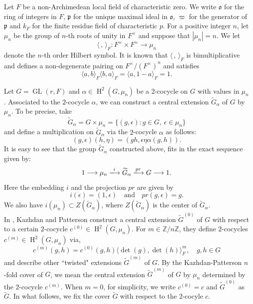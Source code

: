\documentclass[11pt, a4paper, reqno]{amsart}
\theoremstyle{definition}
\theoremstyle{remark}
\theoremstyle{example}
\theoremstyle{note}
\numberwithin{equation}{section}
\DeclareMathOperator{\GL}{GL}
\DeclareMathOperator{\coh}{H}
\begin{document}
Let $F$ be a non-Archimedean local field of characteristic zero. We write $\mathfrak{o}$ for the ring of integers in $F$, $\mathfrak{p}$ for the unique maximal ideal in $\mathfrak{o}$, $\varpi$ for the generator of $\mathfrak{p}$ and $k_{F}$ for the finite residue field of characteristic $p$. For a positive integer $n$, let $\mu_{n}$ be the group of $n$-th roots of unity in $F^{\times}$ and suppose that $|\mu_{n}|=n.$ We let \[\langle \, , \, \rangle_F: F^{\times}\times F^{\times}\rightarrow \mu_{n}\] denote the $n$-th order Hilbert symbol. It %
is known that $\langle \, , \, \rangle_{F}$ is bimultiplicative and defines a non-degenerate pairing on $F^\times/(F^\times)^{n}$ and satisfies
$$\langle a,b\rangle_F \langle b,a\rangle_F= \langle a,1-a\rangle_F=1.$$ 

Let $G=\GL(r,F)$ and $\alpha\in\coh^{2}(G, \mu_{n})$ be a 2-cocycle on $G$ with values in $\mu_{n}$. Associated to the $2$-cocycle $\alpha$,
we can construct a central extension $\widetilde{G}_\alpha$ of $G$ by $\mu_n$. To be precise, take $$\widetilde{G}_\alpha = G \times \mu_n = \{(g, \epsilon): g \in G, ~ \epsilon \in \mu_n\}$$ and define a multiplication on $\widetilde{G}_\alpha$ via the $2$-cocycle $\alpha$ as follows:
$$(g, \epsilon) (h, \eta) = (gh, \epsilon \eta  \alpha(g,h)).$$
It is easy to see that the group $\widetilde{G}_\alpha$ constructed above, fits in the exact sequence given by:
$$1 \longrightarrow \mu_n \xlongrightarrow{i} \widetilde{G}_\alpha \xlongrightarrow{pr} G \longrightarrow 1.$$
Here the embedding $i$ and the projection $pr$ are given by $$i(\epsilon) = (1, \epsilon) \quad \text{and} \quad pr(g, \epsilon) = g.$$
We also have $i(\mu_{n})\subset Z(\widetilde{G}_\alpha)$, where $Z(\widetilde{G}_{\alpha})$ is the center of $\widetilde{G}_{\alpha}$. \\
 
In \cite{KazPat[2]}, Kazhdan and Patterson construct a central extension $\widetilde{G}^{(0)}$ of $G$ with respect to a certain $2$-cocycle $c^{(0)} \in \coh^{2}(G, \mu_{n})$.
For $m \in \mathbb{Z}/n\mathbb{Z}$, they define $2$-cocycles 
$c^{(m)} \in \coh^{2}(G, \mu_{n})$ via,  
\begin{equation*}\label{sigma and sigma c are related}
c^{(m)}(g, h) = c^{(0)}(g, h)  \langle \det(g), \det(h) \rangle_F^m, \quad g, h \in G
\end{equation*}
and describe other ``twisted" extensions $\widetilde{G}^{(m)}$ of $G$. By the Kazhdan-Patterson $n$-fold cover of $G$, we mean the central extension $\widetilde{G}^{(m)}$ of $G$ by $\mu_{n}$ determined by the $2$-cocycle $c^{(m)}$. When $m=0$, for simplicity, we write $c^{(0)}=c$ and $\widetilde{G}^{(0)}$ as $\widetilde{G}$. In what follows, we fix the cover $\widetilde{G}$ with respect to the $2$-cocyle $c$. \\
\end{document}
